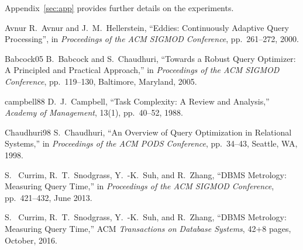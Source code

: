 \documentclass[prodmode,acmtods]{acmsmall}
\begin{document}
Appendix~\ref{sec:app} provides further details on the experiments.

%


\newcommand{\etalchar}[1]{$^{#1}$}
\begin{thebibliography}{99}

\vspace{0.1em}
\bibitem
{Avnur}
R.~Avnur and J.~M.~Hellerstein, ``Eddies: Continuously Adaptive Query
Processing'', in {\em Proceedings of the ACM SIGMOD Conference},
pp.~261--272, 2000.

\bibitem
{Babcock05}
B.~Babcock and S.~Chaudhuri, ``Towards a Robust Query Optimizer: A
Principled and Practical Approach,'' in {\em Proceedings of the ACM SIGMOD
  Conference}, pp.~119--130, Baltimore, Maryland, 2005.

\bibitem
{campbell88}
D.~J.~Campbell, ``Task Complexity: A Review and Analysis,'' {\em Academy of Management}, 13(1), pp.~40--52, 1988. 

\bibitem
{Chaudhuri98}
S.~Chaudhuri, ``An Overview of Query Optimization in Relational Systems,'' in {\em Proceedings of the ACM PODS Conference}, pp.~34--43, Seattle, WA, 1998.


S.~ Currim, R.~T.~Snodgrass, Y.~-K.~Suh, and R.~Zhang,
``DBMS Metrology: Measuring Query Time,'' in {\em Proceedings of the ACM
  SIGMOD Conference}, pp.~421--432, June 2013.

S.~ Currim, R.~T.~Snodgrass, Y.~-K.~Suh, and R.~Zhang,
``DBMS Metrology: Measuring Query Time,'' ACM {\em Transactions
on Database Systems}, 42+8 pages, October, 2016.

\end{thebibliography}
\end{document}
